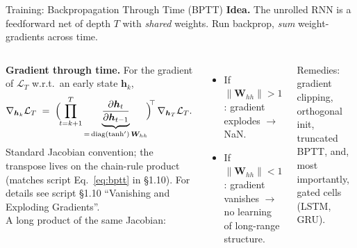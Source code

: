 \documentclass[aspectratio=169,11pt]{beamer}
\newcommand{\emphc}[1]{\textcolor{harvardcrimson}{#1}}
\newcommand{\W}{\bm{W}}
\begin{document}
\begin{frame}{Training: Backpropagation Through Time (BPTT)}
\footnotesize
\textbf{Idea.}  The unrolled RNN is a feedforward net of depth $T$ with \emph{shared} weights.  Run backprop, \emph{sum} weight-gradients across time.

\vspace{3pt}
\begin{columns}[T]
\textbf{Gradient through time.} For the gradient of $\mathcal{L}_T$ w.r.t.\ an early state $\bm{h}_k$,
\[
\nabla_{\bm{h}_k}\mathcal{L}_T \;=\; \Bigl(\!\prod_{t=k+1}^{T} \underbrace{\frac{\partial \bm{h}_t}{\partial \bm{h}_{t-1}}}_{=\,\mathrm{diag}(\tanh')\,\W_{hh}}\!\Bigr)^{\!\!\top}\,\nabla_{\bm{h}_T}\mathcal{L}_T.
\]
{\scriptsize Standard Jacobian convention; the transpose lives on the chain-rule product (matches script Eq.~\eqref*{eq:bptt} in \S1.10). For details see script \S1.10 ``Vanishing and Exploding Gradients''.}\\[2pt]
A \emphc{long product of the same Jacobian}:
\begin{itemize}\itemsep1pt
    \item If $\|\W_{hh}\|\!>\!1$: gradient \emphc{explodes} $\to$ NaN.
    \item If $\|\W_{hh}\|\!<\!1$: gradient \emphc{vanishes} $\to$ no learning of long-range structure.
\end{itemize}

\vspace{1pt}
{\scriptsize\emphc{Remedies:} gradient clipping, orthogonal init, truncated BPTT, and, most importantly, \emphc{gated cells} (LSTM, GRU).}

\centering
{}
\end{columns}
\end{frame}
\end{document}
